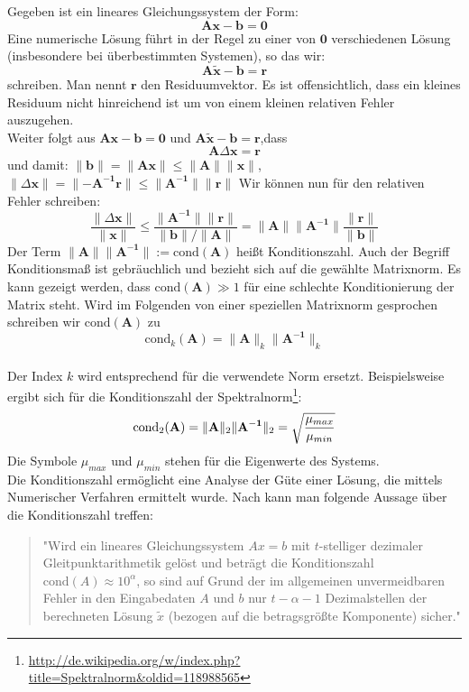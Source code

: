 %
Gegeben ist ein lineares Gleichungssystem der Form:
$$ \mathbf{A}\mathbf{x}-\mathbf{b} =\mathbf{0} $$
Eine numerische Lösung führt in der Regel zu einer von $\mathbf{0}$ verschiedenen Lösung (insbesondere bei überbestimmten Systemen), so das wir:
$$ \mathbf{A}\mathbf{\tilde{x}}-\mathbf{b} =\mathbf{r} $$
schreiben. Man nennt $\mathbf{r}$ den Residuumvektor. Es ist offensichtlich, dass ein kleines Residuum nicht hinreichend ist um von einem kleinen relativen Fehler auszugehen.\\
Weiter folgt aus $\mathbf{A}\mathbf{x}-\mathbf{b} =\mathbf{0}$ und $\mathbf{A}\mathbf{\tilde{x}}-\mathbf{b} =\mathbf{r}$,dass 
$$ \mathbf{A}\Delta\mathbf{x}=\mathbf{r}$$
und damit:
$ 
\lVert \mathbf{b} \rVert=\lVert \mathbf{Ax} \rVert \leq \lVert \mathbf{A} \rVert \lVert \mathbf{x} \rVert
$, 
$
\lVert \Delta\mathbf{x} \rVert=\lVert -\mathbf{A^{-1}r} \rVert \leq \lVert \mathbf{A^{-1}} \rVert \lVert \mathbf{r} \rVert
$
Wir können nun für den relativen Fehler schreiben:
$$
\frac{\lVert \Delta\mathbf{x} \rVert}{\lVert \mathbf{x} \rVert} \leq 
\frac{\lVert \mathbf{A^{-1}} \rVert \lVert \mathbf{r} \rVert}{\lVert \mathbf{b} \rVert / \lVert \mathbf{A} \rVert} =
\lVert \mathbf{A} \rVert \lVert \mathbf{A^{-1}} \rVert \frac{\lVert \mathbf{r} \rVert}{\lVert \mathbf{b} \rVert}
$$
Der Term $\lVert \mathbf{A} \rVert \lVert \mathbf{A^{-1}} \rVert := \text{cond}(\mathbf{A})$ heißt Konditionszahl. Auch der Begriff Konditionsmaß ist gebräuchlich und bezieht sich auf die gewählte Matrixnorm.
Es kann gezeigt werden, dass $\text{cond}(\mathbf{A}) \gg 1$  für eine schlechte Konditionierung der Matrix steht. Wird im Folgenden von einer speziellen Matrixnorm gesprochen schreiben wir $\text{cond}(\mathbf{A})$ zu 
$$ 
\text{cond}_k(\mathbf{A}) = \lVert \mathbf{A} \rVert_k \lVert \mathbf{A^{-1}} \rVert_k
$$ \\
Der Index $k$ wird entsprechend für die verwendete Norm ersetzt. Beispielsweise ergibt sich für die Konditionszahl der Spektralnorm\footnote{\url{http://de.wikipedia.org/w/index.php?title=Spektralnorm&oldid=118988565}}:
$$ 
\text{cond}_2(\mathbf{A}) = \lVert \mathbf{A} \rVert_2 \lVert \mathbf{A^{-1}} \rVert_2=
\sqrt{\frac{\mu_{max}}{\mu_{min}}}\\
$$
Die Symbole $\mu_{max}$ und $\mu_{min}$ stehen für die Eigenwerte des Systems.\\

Die Konditionszahl ermöglicht eine Analyse der Güte einer Lösung, die mittels Numerischer Verfahren ermittelt wurde. Nach \cite{hermann2006numerische} kann man folgende Aussage über die Konditionszahl treffen:
%
\begin{quote}
"Wird ein lineares Gleichungssystem $Ax=b$ mit $t$-stelliger dezimaler Gleitpunktarithmetik gelöst und beträgt die Konditionszahl $\text{cond}(A) \approx10^\alpha$, so sind auf Grund der im allgemeinen unvermeidbaren Fehler in den Eingabedaten $A$ und $b$ nur $t-\alpha-1$ Dezimalstellen der berechneten Lösung $\tilde{x}$ (bezogen auf die betragsgrößte Komponente) sicher."
\end{quote}
